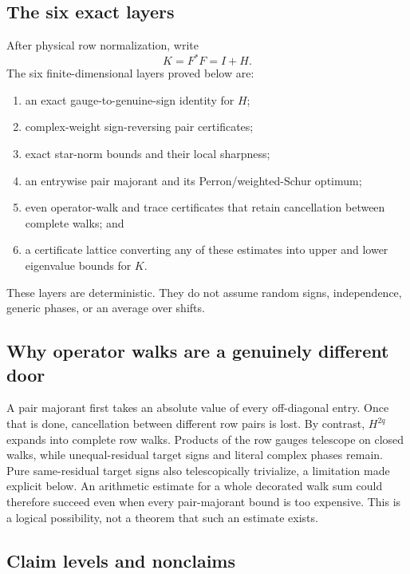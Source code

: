 \subsection{The six exact layers}

After physical row normalization, write
\[
 K=F^*F=I+H.
\]
The six finite-dimensional layers proved below are:
\begin{enumerate}[label=\textup{(\Alph*)},leftmargin=3em]
 \item an exact gauge-to-genuine-sign identity for \(H\);
 \item complex-weight sign-reversing pair certificates;
 \item exact star-norm bounds and their local sharpness;
 \item an entrywise pair majorant and its Perron/weighted-Schur optimum;
 \item even operator-walk and trace certificates that retain cancellation
       between complete walks; and
 \item a certificate lattice converting any of these estimates into upper
       and lower eigenvalue bounds for \(K\).
\end{enumerate}
These layers are deterministic.  They do not assume random signs,
independence, generic phases, or an average over shifts.

\subsection{Why operator walks are a genuinely different door}

A pair majorant first takes an absolute value of every off-diagonal entry.
Once that is done, cancellation between different row pairs is lost.
By contrast, \(H^{2q}\) expands into complete row walks.  Products of the
row gauges telescope on closed walks, while unequal-residual target signs
and literal complex phases remain.  Pure same-residual target signs also
telescopically trivialize, a limitation made explicit below.  An arithmetic
estimate for a whole decorated walk sum could
therefore succeed even when every pair-majorant bound is too expensive.
This is a logical possibility, not a theorem that such an estimate exists.

\subsection{Claim levels and nonclaims}

